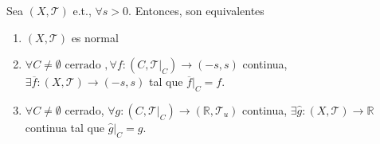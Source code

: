 \begin{prop}
  Sea $( X, \mathcal{T} )$ e.t., $\forall s > 0$. Entonces, son equivalentes
  \begin{enumerate}[label=(\roman*)]
    \item $( X, \mathcal{T} )$ es normal 
    \item $\forall C \neq \emptyset \text{ cerrado }, \forall f: ( C, \mathcal{T}|_{C}) \to ( -s, s )$ continua, $\exists \overline{f}: ( X, \mathcal{T} ) \to ( -s, s )$ tal que $\overline{f}|_{C} = f$.
    \item $\forall C \neq \emptyset$ cerrado, $\forall g: ( C, \mathcal{T}|_{C}) \to ( \mathbb{R}, \mathcal{T}_{u} )$ continua, $\exists \hat{g}: ( X, \mathcal{T} ) \to \mathbb{R}$ continua tal que $\hat{g}|_{C} = g$.
  \end{enumerate}
\end{prop}


